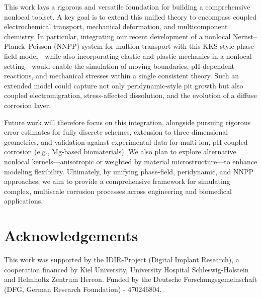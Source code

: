 \documentclass[]{article}
\begin{document}
This work lays a rigorous and versatile foundation for building a comprehensive nonlocal toolset. A key goal is to extend this unified theory to encompass coupled electrochemical transport, mechanical deformation, and multicomponent chemistry. In particular, integrating our recent development of a nonlocal Nernst--Planck--Poisson (NNPP) system for multion transport with this KKS-style phase-field model—while also incorporating elastic and plastic mechanics in a nonlocal setting—would enable the simulation of moving boundaries, pH-dependent reactions, and mechanical stresses within a single consistent theory. Such an extended model could capture not only peridynamic-style pit growth but also coupled electromigration, stress-affected dissolution, and the evolution of a diffuse corrosion layer.

Future work will therefore focus on this integration, alongside pursuing rigorous error estimates for fully discrete schemes, extension to three-dimensional geometries, and validation against experimental data for multi-ion, pH-coupled corrosion (e.g., Mg-based biomaterials). We also plan to explore alternative nonlocal kernels—anisotropic or weighted by material microstructure—to enhance modeling flexibility. Ultimately, by unifying phase-field, peridynamic, and NNPP approaches, we aim to provide a comprehensive framework for simulating complex, multiscale corrosion processes across engineering and biomedical applications.

\section*{Acknowledgements}
%
This work was supported by the IDIR-Project (Digital Implant Research), a cooperation financed by Kiel University, University Hospital Schleswig-Holstein and Helmholtz Zentrum Hereon. Funded by the Deutsche Forschungsgemeinschaft (DFG, German Research Foundation) - 470246804.



\end{document}
